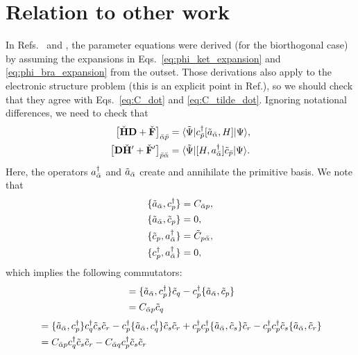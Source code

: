 \documentclass[aip,jcp,preprint,superscriptaddress,nofootinbib]{revtex4-1}
\begin{document}
\section{Relation to other work}
In Refs.~ and ,
the parameter equations were derived (for the biorthogonal case) by assuming the expansions in
Eqs.~\eqref{eq:phi_ket_expansion} and \eqref{eq:phi_bra_expansion} from the outset.
Those derivations also apply to the electronic structure problem
(this is an explicit point in Ref.), so we
should check that they agree with Eqs.~\eqref{eq:C_dot} and \eqref{eq:C_tilde_dot}.
Ignoring notational differences, we need to check that
\begin{align}
    \big[ \check{\mathbf{H}} \mathbf{D} + \check{\mathbf{F}} \big]_{\bar{\alpha} \bar{p}}
    &= \langle \tilde{\Psi} \vert  c^{\dagger}_{\bar{p}} [\tilde{a}_{\bar{\alpha}}, H]  \vert \Psi \rangle,  \label{eq:F_check_correspondence} \\
    \big[ \mathbf{D} \check{\mathbf{H}}' + \check{\mathbf{F}}' \big]_{\bar{p} \bar{\alpha}} 
    &= \langle \tilde{\Psi} \vert  [H, a^{\dagger}_{\bar{\alpha}}] \tilde{c}_{\bar{p}}   \vert \Psi \rangle.  \label{eq:F_check_prime_correspondence}
\end{align}
Here, the operators $a^{\dagger}_{\bar{\alpha}}$ and $\tilde{a}_{\bar{\alpha}}$ create and annihilate
the primitive basis. We note that
\begin{align}
    \{ \tilde{a}_{\bar{\alpha}}, c^{\dagger}_{p} \} &= C_{\bar{\alpha} p}, \\
    \{ \tilde{a}_{\bar{\alpha}}, \tilde{c}_{p} \} &= 0, \\
    \{ \tilde{c}_{p}, a^{\dagger}_{\bar{\alpha}} \} &= \tilde{C}_{p \bar{\alpha}}, \\
    \{ c^{\dagger}_{p}, a^{\dagger}_{\bar{\alpha}} \} &= 0,
\end{align}
which implies the following commutators:
\begin{align}
    [\anniprim{\bar{\alpha}}, \crea{p} \anni{q}] 
    &= \{ \anniprim{\bar{\alpha}}, \crea{p} \} \anni{q} - \crea{p} \{ \anniprim{\bar{\alpha}}, \anni{p} \} \nn
    &= C_{\bar{\alpha} p} \anni{q}
\end{align}
\begin{align}
    [\anniprim{\bar{\alpha}}, \crea{p} \crea{q} \anni{s} \anni{r}] 
    &= \{ \anniprim{\bar{\alpha}}, \crea{p} \} \crea{q} \anni{s} \anni{r} 
     - \crea{p} \{ \anniprim{\bar{\alpha}}, \crea{q} \} \anni{s} \anni{r}
     + \crea{p} \crea{p} \{ \anniprim{\bar{\alpha}}, \anni{s} \} \anni{r}
     - \crea{p} \crea{p} \anni{s} \{ \anniprim{\bar{\alpha}}, \anni{r} \}  \nn
    &= C_{\bar{\alpha} p} \crea{q} \anni{s} \anni{r} - C_{\bar{\alpha} q} \crea{p} \anni{s} \anni{r}
\end{align}
\end{document}
